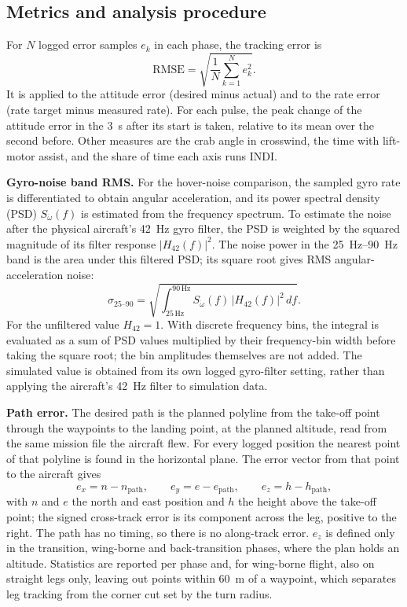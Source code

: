 \documentclass{article}
\begin{document}
\subsection{Metrics and analysis procedure}
\label{sec:metrics}
For $N$ logged error samples $e_k$ in each phase, the tracking error is
\begin{equation}
    \mathrm{RMSE}=\sqrt{\frac{1}{N}\sum_{k=1}^{N} e_k^2}.
    \label{eq:rmse}
\end{equation}
It is applied to the attitude error (desired minus actual) and to the rate error (rate target minus measured rate). For each pulse, the peak change of the attitude error in the \SI{3}{\second} after its start is taken, relative to its mean over the second before. Other measures are the crab angle in crosswind, the time with lift-motor assist, and the share of time each axis runs INDI.

\textbf{Gyro-noise band RMS.} For the hover-noise comparison, the sampled gyro rate is differentiated to obtain angular acceleration, and its power spectral density (PSD) $S_{\dot\omega}(f)$ is estimated from the frequency spectrum. To estimate the noise after the physical aircraft's \SI{42}{\hertz} gyro filter, the PSD is weighted by the squared magnitude of its filter response $|H_{42}(f)|^2$. The noise power in the \SIrange{25}{90}{\hertz} band is the area under this filtered PSD; its square root gives RMS angular-acceleration noise:
\begin{equation}
    \sigma_{25\text{--}90}=\sqrt{\int_{25\,\mathrm{Hz}}^{90\,\mathrm{Hz}} S_{\dot\omega}(f)\,|H_{42}(f)|^2\,df}.
    \label{eq:gyro-band-rms}
\end{equation}
For the unfiltered value $H_{42}=1$. With discrete frequency bins, the integral is evaluated as a sum of PSD values multiplied by their frequency-bin width before taking the square root; the bin amplitudes themselves are not added. The simulated value is obtained from its own logged gyro-filter setting, rather than applying the aircraft's \SI{42}{\hertz} filter to simulation data.

\textbf{Path error.} The desired path is the planned polyline from the take-off point through the waypoints to the landing point, at the planned altitude, read from the same mission file the aircraft flew. For every logged position the nearest point of that polyline is found in the horizontal plane. The error vector from that point to the aircraft gives
\begin{equation}
    e_x = n - n_{\mathrm{path}}, \qquad e_y = e - e_{\mathrm{path}}, \qquad e_z = h - h_{\mathrm{path}},
    \label{eq:path-error}
\end{equation}
with $n$ and $e$ the north and east position and $h$ the height above the take-off point; the signed cross-track error is its component across the leg, positive to the right. The path has no timing, so there is no along-track error. $e_z$ is defined only in the transition, wing-borne and back-transition phases, where the plan holds an altitude. Statistics are reported per phase and, for wing-borne flight, also on straight legs only, leaving out points within \SI{60}{\meter} of a waypoint, which separates leg tracking from the corner cut set by the turn radius.
\end{document}
